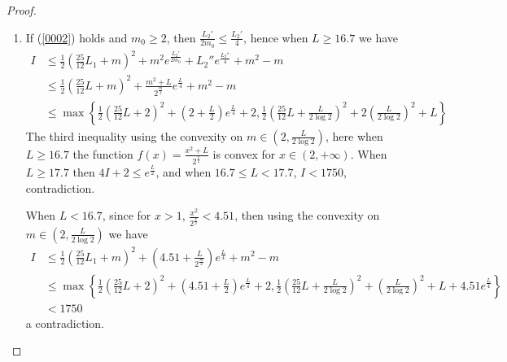 \documentclass[10pt,a4paper]{amsart}
\newcommand{\abs}[1]{\left| #1 \right|}
\newcommand{\bracket}[1]{\left( #1 \right)}
\begin{document}
\begin{proof}
\begin{enumerate}
If $\ell(c_i)<0.25$, we have $\ell(\gamma_2)\geqslant6\log2$, hence $\ell(\gamma_1)\leqslant L-10\log2$. Hence using Lemma \ref{lemma_32} we have $w(\gamma_1)\leqslant\frac1{32}e^{\frac{L}2}$, then
$$k=\abs{\Gamma\cap\Gamma}\leqslant\frac12\bracket{\frac{25}{12}L+2}^2+\frac1{16}e^{\frac{L}2}+4$$
When $L>17.7$ we have $4k+2<e^{\frac{L}2}$, when $L\leqslant17.7$ we have $k<1750$, ontradiction.


\item
If (\ref{0002}) holds and $m_0\geqslant2$, then $\frac{L_2'}{2m_0}\leqslant\frac{L_2'}4$, hence when $L\geqslant16.7$ we have
\begin{align*}
I&\leqslant\frac12\bracket{\frac{25}{12}L_1+m}^2+m^2e^{\frac{L_2'}{2m_0}}+{L_2''}e^{\frac{L_2''}4}+m^2-m\\
&\leqslant\frac12\bracket{\frac{25}{12}L+m}^2+\frac{m^2+L}{2^{\frac{m}2}}e^{\frac{L}4}+m^2-m\\
&\leqslant\max\left\{\frac12\bracket{\frac{25}{12}L+2}^2+(2+\frac{L}2)e^{\frac{L}4}+2, \frac12\bracket{\frac{25}{12}L+\frac{L}{2\log2}}^2+2\bracket{\frac{L}{2\log2}}^2+L\right\}
\end{align*}
The third inequality using the convexity on $m\in(2,\frac{L}{2\log2})$, here when $L\geqslant16.7$ the function $f(x)=\frac{x^2+L}{2^{\frac{x}2}}$ is convex for $x\in(2,+\infty)$. When $L\geqslant17.7$ then $4I+2\leqslant e^{\frac{L}2}$, and when $16.7\leqslant L<17.7$, $I<1750$, contradiction.

When $L<16.7$, since for $x>1$, $\frac{x^2}{2^{\frac{x}2}}<4.51$, then using the convexity on $m\in(2,\frac{L}{2\log2})$ we have
\begin{align*}
I&\leqslant\frac12\bracket{\frac{25}{12}L_1+m}^2+(4.51+\frac{L}{2^{\frac{m}2}})e^{\frac{L}4}+m^2-m\\
&\leqslant\max\left\{\frac12\bracket{\frac{25}{12}L+2}^2+(4.51+\frac{L}2)e^{\frac{L}4}+2, \frac12\bracket{\frac{25}{12}L+\frac{L}{2\log2}}^2+\bracket{\frac{L}{2\log2}}^2+L+4.51e^{\frac{L}4}\right\}\\
&<1750
\end{align*}
a contradiction.

\end{enumerate}



\end{proof}
\end{document}
